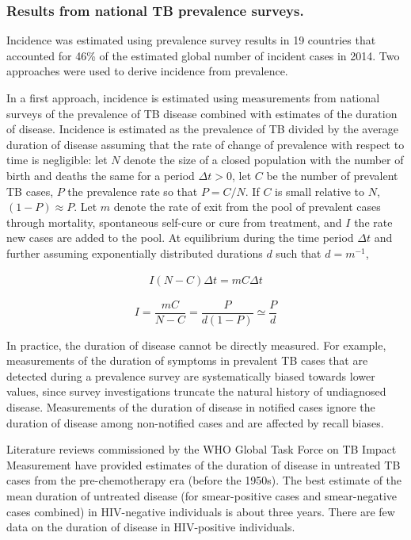 \subsubsection {Results from national TB prevalence surveys.} Incidence was estimated using prevalence survey results in 19 countries that accounted for 46\% of the estimated global number of incident cases in 2014. Two approaches were used to derive incidence from prevalence.

In a first approach, incidence is estimated using measurements from national surveys of the prevalence of TB disease combined with estimates of the duration of disease. Incidence is estimated as the prevalence of TB divided by the average duration of disease assuming that the rate of change of prevalence with respect to time is negligible: let $N$ denote the size of a closed population with the number of birth and deaths the same for a period $\Delta t > 0$, let $C$ be the number of prevalent TB cases, $P$ the prevalence rate so that $P = C/N$. If $C$ is small relative to $N$, $(1-P) \approx P$. Let $m$ denote the rate of exit from the pool of prevalent cases through mortality, spontaneous self-cure or cure from treatment, and $I$ the rate new cases are added to the pool. At equilibrium during the time period $\Delta t$ and further assuming exponentially distributed durations $d$ such that $d = m^{-1}$,

\begin{align*}
I(N - C)\Delta t = m C \Delta t
\end{align*}

\begin{equation}
I = \frac{m C}{N - C} = \frac{P}{d(1 - P)} \simeq \frac{P}{d}
\label{eqn:prev2inc}
\end{equation}

In practice, the duration of disease cannot be directly measured. For example, measurements of the duration of symptoms in prevalent TB cases that are detected during a prevalence survey are systematically biased towards lower values, since survey investigations truncate the natural history of undiagnosed disease. Measurements of the duration of disease in notified cases ignore the duration of disease among non-notified cases and are affected by recall biases. 

Literature reviews commissioned by the WHO Global Task Force on TB Impact Measurement have provided estimates of the duration of disease in untreated TB cases from the pre-chemotherapy era (before the 1950s). The best estimate of the mean duration of untreated disease (for smear-positive cases and smear-negative cases combined) in HIV-negative individuals is about three years. There are few data on the duration of disease in HIV-positive individuals. 

